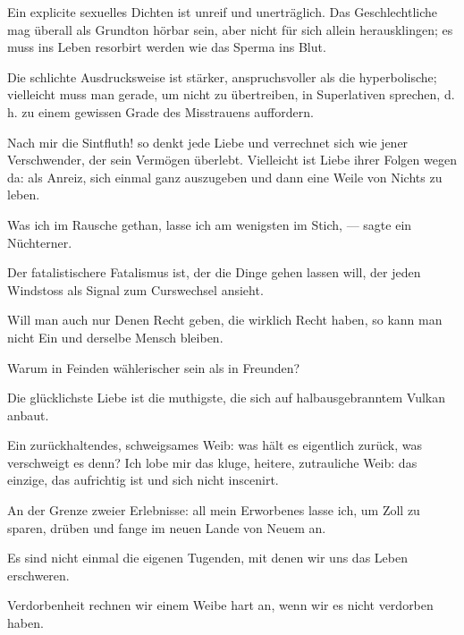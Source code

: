 Ein explicite sexuelles Dichten ist unreif und unerträglich. Das Geschlechtliche mag überall als Grundton hörbar sein, aber nicht für sich allein herausklingen; es muss ins Leben resorbirt werden wie das Sperma ins Blut.
\par

Die schlichte Ausdrucksweise ist stärker, anspruchsvoller als die hyperbolische; vielleicht muss man gerade, um nicht zu übertreiben, in Superlativen sprechen, d. h. zu einem gewissen Grade des Misstrauens auffordern.
\par

Nach mir die Sintfluth! so denkt jede Liebe und verrechnet sich wie jener Verschwender, der sein Vermögen überlebt. Vielleicht ist Liebe ihrer Folgen wegen da: als Anreiz, sich einmal ganz auszugeben und dann eine Weile von Nichts zu leben.
\par

Was ich im Rausche gethan, lasse ich am wenigsten im Stich, — sagte ein Nüchterner.
\par

Der fatalistischere Fatalismus ist, der die Dinge  gehen lassen will, der jeden Windstoss als Signal zum Curswechsel ansieht.
\par

 Will man auch nur Denen Recht geben, die wirklich Recht haben, so kann man nicht Ein und derselbe Mensch bleiben.
\par

Warum in Feinden wählerischer sein als in Freunden?
\par

Die glücklichste Liebe ist die muthigste, die sich auf halbausgebranntem Vulkan anbaut.
\par

Ein zurückhaltendes, schweigsames Weib: was hält es eigentlich zurück, was verschweigt es denn? Ich lobe mir das kluge, heitere, zutrauliche Weib: das einzige, das aufrichtig ist und sich nicht inscenirt.
\par

An der Grenze zweier Erlebnisse: all mein Erworbenes lasse ich, um Zoll zu sparen, drüben und fange im neuen Lande von Neuem an.
\par

Es sind nicht einmal die eigenen Tugenden, mit denen wir uns das Leben erschweren.
\par

Verdorbenheit rechnen wir einem Weibe hart an, wenn wir es nicht verdorben haben.
\par

